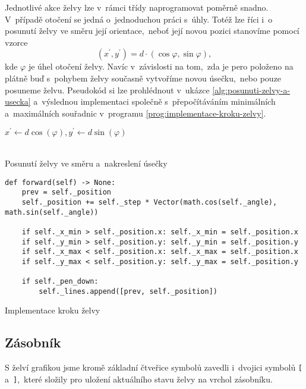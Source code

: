 Jednotlivé akce želvy lze v~rámci třídy naprogramovat poměrně snadno. V~případě otočení se jedná o~jednoduchou práci s~úhly. Totéž lze říci i~o posunutí želvy ve směru její orientace,~neboť její novou pozici stanovíme pomocí vzorce
\[(x^\prime,y^\prime)=d\cdot(\cos\varphi,\sin\varphi),\]
kde $\varphi$ je úhel otočení želvy. Navíc v~závislosti na tom,~zda je pero položeno na plátně buď s~pohybem želvy současně vytvoříme novou úsečku,~nebo pouze posuneme želvu. Pseudokód si lze prohlédnout v~ukázce \ref{alg:posunuti-zelvy-a-usecka} a~výslednou implementaci společně s~přepočítáváním minimálních a~maximálních souřadnic v~programu \ref{prog:implementace-kroku-zelvy}.
\begin{algorithm}[h]
    $x^\prime\gets d\cos(\varphi),y^\prime\gets d\sin(\varphi)$\\
    \\
    \caption{Posunutí želvy ve směru a~nakreslení úsečky}
    \label{alg:posunuti-zelvy-a-usecka}
\end{algorithm}
\begin{program}[h]
\begin{lstlisting}[style=python]
def forward(self) -> None:
    prev = self._position
    self._position += self._step * Vector(math.cos(self._angle), math.sin(self._angle))

    if self._x_min > self._position.x: self._x_min = self._position.x
    if self._y_min > self._position.y: self._y_min = self._position.y
    if self._x_max < self._position.x: self._x_max = self._position.x
    if self._y_max < self._position.y: self._y_max = self._position.y

    if self._pen_down:
        self._lines.append([prev, self._position])
\end{lstlisting}
    \caption{Implementace kroku želvy}
    \label{prog:implementace-kroku-zelvy}
\end{program}

\subsection{Zásobník}\label{subsec:zasobnik}

S želví grafikou jsme kromě základní čtveřice symbolů zavedli i~dvojici symbolů \texttt{[} a~\texttt{]},~které složily pro uložení aktuálního stavu želvy na vrchol zásobníku.

